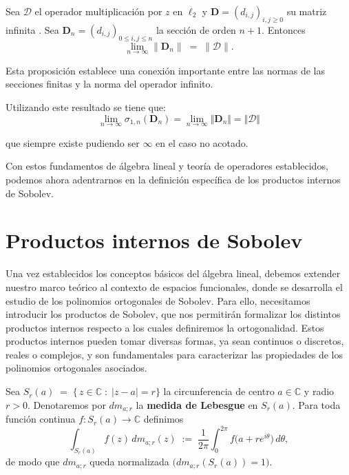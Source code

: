 \begin{proposition}\label{prop:singular_values_limit}
  Sea $\mathcal{D}$ el operador multiplicación por $z$ en
  $\ell_2$ y
  $\mathbf{D}=(d_{i,j})_{i,j\ge0}$ su matriz infinita
  . Sea
  $\mathbf{D}_n=(d_{i,j})_{0\le i,j\le n}$ la sección de orden $n+1$. Entonces
  \[
    \lim_{n\to\infty}\|\mathbf{D}_n\|
    \;=\;\|\mathcal{D}\|.
  \]
\end{proposition}

Esta proposición establece una conexión importante entre las normas de las secciones finitas y la norma del operador infinito.

\noindent Utilizando este resultado se tiene que:
$$
  \lim_{n\to \infty} \sigma_{1,n}(\mathbf{D}_n)= \lim_{n \to \infty} \Vert \mathbf{D}_n\Vert= \Vert \mathcal{D}\Vert
$$

\noindent que siempre existe pudiendo ser $\infty$ en el caso no acotado.

Con estos fundamentos de álgebra lineal y teoría de operadores establecidos, podemos ahora adentrarnos en la definición específica de los productos internos de Sobolev.

\section{Productos internos de Sobolev}

\noindent Una vez establecidos los conceptos básicos del álgebra lineal, debemos extender nuestro marco teórico al contexto de espacios funcionales, donde se desarrolla el estudio de los polinomios ortogonales de Sobolev. Para ello, necesitamos introducir los productos de Sobolev, que nos permitirán formalizar los distintos productos internos respecto a los cuales definiremos la ortogonalidad. Estos productos internos pueden tomar diversas formas, ya sean continuos o discretos, reales o complejos, y son fundamentales para caracterizar las propiedades de los polinomios ortogonales asociados.

\begin{definition}\label{def:circum_lebesgue_measure}
  Sea
  \(
  S_{r}(a)\;=\;\bigl\{\,z\in\mathbb{C}\;:\;|z-a|=r\bigr\}
  \)
  la circunferencia de centro \(a\in\mathbb{C}\) y radio \(r>0\).
  Denotaremos por \(dm_{a;r}\) la \textbf{medida de Lebesgue} en \(S_{r}(a)\).
  Para toda función continua \(f:S_{r}(a)\to\mathbb{C}\) definimos
  $$
    \int_{S_{r}(a)} f(z)\,dm_{a;r}(z)
    \;:=\;
    \frac{1}{2\pi}\int_{0}^{2\pi} f\!\bigl(a+re^{i\theta}\bigr)\,d\theta,
  $$
  de modo que \(dm_{a;r}\) queda normalizada
  \(\bigl(dm_{a;r}(S_{r}(a))=1\bigr)\).
\end{definition}

